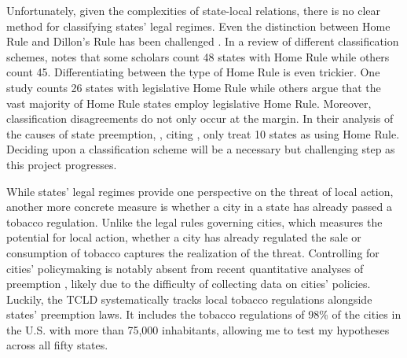 \documentclass[12pt]{article}
\begin{document}
Unfortunately, given the complexities of state-local relations, there is no clear method for classifying states' legal regimes. Even the distinction between Home Rule and Dillon's Rule has been challenged \parencite{richardsonDillonRuleMars2011}. In a review of different classification schemes, \textcite{dillerIntrastatePreemption2007} notes that some scholars count 48 states with Home Rule while others count 45. Differentiating between the type of Home Rule is even trickier. One study counts 26 states with legislative Home Rule while others argue that the vast majority of Home Rule states employ legislative Home Rule. Moreover, classification disagreements do not only occur at the margin. In their analysis of the causes of state preemption, \textcite{fowlerStatePreemptionLocal2019}, citing \textcite{kraneHomeRuleAmerica2000}, only treat 10 states as using Home Rule. Deciding upon a classification scheme will be a necessary but challenging step as this project progresses.

While states' legal regimes provide one perspective on the threat of local action, another more concrete measure is whether a city in a state has already passed a tobacco regulation. Unlike the legal rules governing cities, which measures the potential for local action, whether a city has already regulated the sale or consumption of tobacco captures the realization of the threat. Controlling for cities' policymaking is notably absent from recent quantitative analyses of preemption \parencite{fowlerStatePreemptionLocal2019,goodmanStateLegislativeIdeology2019,flavinExplainingStatePreemption2019}, likely due to the difficulty of collecting data on cities' policies. Luckily, the TCLD systematically tracks local tobacco regulations alongside states' preemption laws. It includes the tobacco regulations of 98\% of the cities in the U.S. with more than 75,000 inhabitants, allowing me to test my hypotheses across all fifty states.
\end{document}
